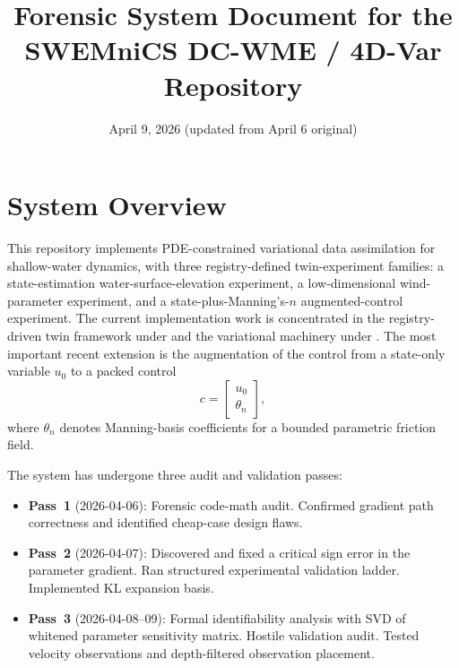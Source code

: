 \documentclass[11pt]{article}
\title{Forensic System Document for the SWEMniCS DC-WME / 4D-Var Repository}
\author{}
\date{April 9, 2026 (updated from April 6 original)}
\begin{document}
\maketitle

\section{System Overview}
This repository implements PDE-constrained variational data assimilation for shallow-water dynamics, with three registry-defined twin-experiment families: a state-estimation water-surface-elevation experiment, a low-dimensional wind-parameter experiment, and a state-plus-Manning's-$n$ augmented-control experiment. The current implementation work is concentrated in the registry-driven twin framework under  and the variational machinery under . The most important recent extension is the augmentation of the control from a state-only variable $u_0$ to a packed control
\[
c = \begin{bmatrix} u_0 \\ \theta_n \end{bmatrix},
\]
where $\theta_n$ denotes Manning-basis coefficients for a bounded parametric friction field.

The system has undergone three audit and validation passes:
\begin{itemize}
\item \textbf{Pass~1} (2026-04-06): Forensic code-math audit. Confirmed gradient path correctness and identified cheap-case design flaws.
\item \textbf{Pass~2} (2026-04-07): Discovered and fixed a critical sign error in the parameter gradient. Ran structured experimental validation ladder. Implemented KL expansion basis.
\item \textbf{Pass~3} (2026-04-08--09): Formal identifiability analysis with SVD of whitened parameter sensitivity matrix. Hostile validation audit. Tested velocity observations and depth-filtered observation placement.
\end{itemize}
\end{document}
